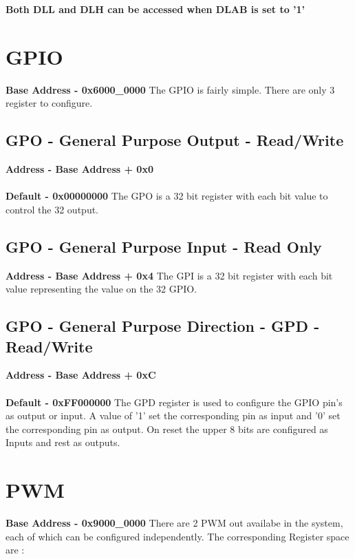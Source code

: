 \documentclass[12pt,a4paper]{report}
\begin{document}
\textbf{Both DLL and DLH  can be accessed when DLAB is set to '1'}

\section{GPIO}
\hspace{1.6cm}
\textbf{Base Address - 0x6000\_0000}
The GPIO is fairly simple. There are only 3 register to configure.

\subsection{GPO - General Purpose Output  -  Read/Write}
\hspace{1.6cm}
\textbf{Address - Base Address + 0x0}
\\
\\
\textbf{Default - 0x00000000 }
The GPO is a 32 bit register with each bit value to control the 32 output.

\subsection{GPO - General Purpose Input  - Read Only }
\hspace{1.6cm}
\textbf{Address - Base Address + 0x4}
The GPI is a 32 bit register with each bit value representing the value on the 32 GPIO.


\subsection{GPO - General Purpose Direction - GPD - Read/Write}
\hspace{1.6cm}
\textbf{Address - Base Address + 0xC}
\\
\\
\textbf{Default - 0xFF000000}
The GPD register is used to configure the GPIO pin's as output or input. A value of '1' set the corresponding pin as input and '0' set the corresponding pin as output. On reset the upper 8 bits are configured as Inputs and rest as outputs.


\section{PWM}
\hspace{1.6cm}
\textbf{Base Address - 0x9000\_0000}
There are 2 PWM out availabe in the system, each of which can be configured independently. The corresponding Register space are :
\end{document}
